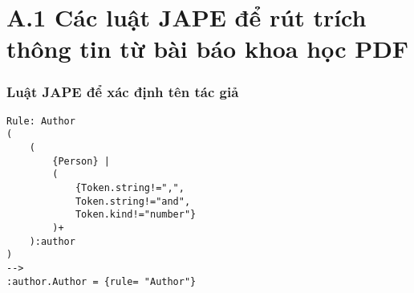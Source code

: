 
\section*{A.1 Các luật JAPE để rút trích thông tin từ bài báo khoa học PDF}
\subsubsection*{Luật JAPE để xác định tên tác giả}
\begin{lstlisting}[frame=single]
Rule: Author
(
	(
		{Person} | 
		( 
			{Token.string!=",", 
			Token.string!="and", 
			Token.kind!="number"}
		)+
	):author
)
-->
:author.Author = {rule= "Author"}
\end{lstlisting}


